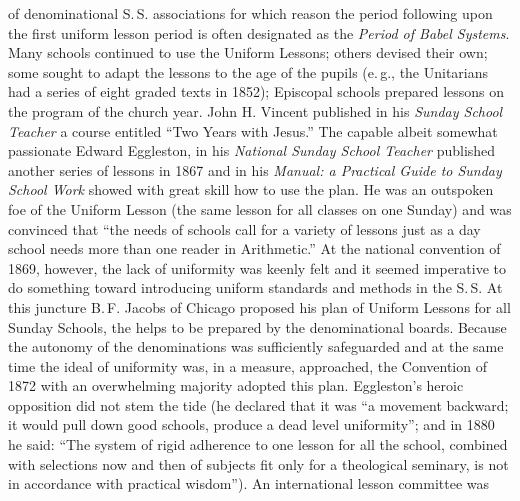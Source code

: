 of denominational S.\,S. associations for which reason the period following upon the first uniform lesson period is often designated as the \emph{Period of Babel Systems}. Many schools continued to use the Uniform Lessons; others devised their own; some sought to adapt the lessons to the age of the pupils (e.\,g., the Unitarians had a series of eight graded texts in 1852); Episcopal schools prepared lessons on the program of the church year. John H. Vincent published in his \emph{Sunday School Teacher} a course entitled “Two Years with Jesus.” The capable albeit somewhat passionate Edward Eggleston, in his \emph{National Sunday School Teacher} published another series of lessons in 1867 and in his \emph{Manual: a Practical Guide to Sunday School Work} showed with great skill how to use the plan. He was an outspoken foe of the Uniform Lesson (the same lesson for all classes on one Sunday) and was convinced that “the needs of schools call for a variety of lessons just as a day school needs more than one reader in Arithmetic.” At the national convention of 1869, however, the lack of uniformity was keenly felt and it seemed imperative to do something toward introducing uniform standards and methods in the S.\,S. At this juncture B.\,F. Jacobs of Chicago proposed his plan of Uniform Lessons for all Sunday Schools, the helps to be prepared by the denominational boards. Because the autonomy of the denominations was sufficiently safeguarded and at the same time the ideal of uniformity was, in a measure, approached, the Convention of 1872 with an overwhelming majority adopted this plan. Eggleston’s heroic opposition did not stem the tide (he declared that it was “a movement backward; it would pull down good schools, produce a dead level uniformity”; and in 1880 he said: “The system of rigid adherence to one lesson for all the school, combined with selections now and then of subjects fit only for a theological seminary, is not in accordance with practical wisdom”). An international lesson committee was
